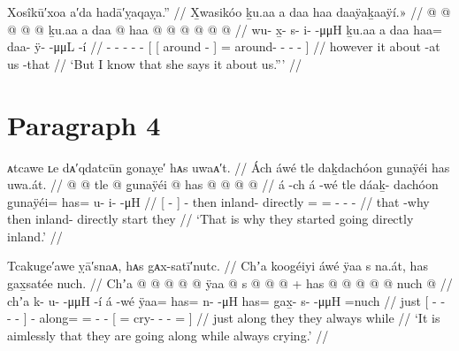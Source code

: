 \ex\label{ex:92-57-I-know-she-says}%
%
\begingl
	\glpreamble	Xosîkū′xoa a′da hadā′ỵaqaỵa.” //
	\glpreamble	X̱wasikóo ḵu.aa a daa haa daaÿaḵaaÿí.\!» //
	\gla	{} @ {} @ {} @ {} @ {} @ {} ḵu.aa
		{} {} a daa @ {} {}
			haa @  @ {} @ {} @ {} @ {} @ {} //
	\glb	wu- x̱- s- i-  -μμH ḵu.aa
		{} {} a daa {} {}
			haa= daa- ÿ-  -μμL -í {} //
	\glc	{}- - - -  - 
		{}[ {}[  around - {}]
			= around- -  - - {}] //
	\gld	{} {} {} {} {} {} however
		{} {} it about -at {}
			us  {} {} {} -that {} //
	\glft	‘But I know that she says it about us.”’
		//
\endgl
\xe


\section{Paragraph 4}\label{sec:92-para-4}

\ex\label{ex:92-58-why-they-went-directly-inland}%
%
\begingl
	\glpreamble	ᴀtcawe ʟe dᴀ′qdatcūn g̣onaỵe′ hᴀs uwaᴀ′t. //
	\glpreamble	Ách áwé tle daḵdachóon g̱unaÿéi has uwa.át. //
	\gla	{}  @ {} {}  @ {}
		tle  @ {}
		g̱unaÿéi @ has @  @ {} @ {} @ {} //
	\glb	{} á -ch {} á -wé
		tle dáaḵ- dachóon
		g̱unaÿéi= has= u- i-  -μH //
	\glc	{}[  - {}]  -
		then inland- directly
		= = - -  - //
	\gld	{} that -why {}  {}
		then inland- directly
		start they  {} {} {} //
	\glft	‘That is why they started going directly inland.’
		//
\endgl
\xe

\ex\label{ex:92-59-going-anywhere-crying}%
%
\begingl
	\glpreamble	Tcakuge′awe ỵā′snaᴀ, hᴀs gᴀx-satī′nutc. //
	\glpreamble	Chʼa koogéiyi áwé ÿaa s na.át, has gax̱satée nuch. //
	\gla	Chʼa {}  @ {} @ {} @ {} @ {} {}
		 @ {}
		ÿaa @ s @  @ {} @ {} +
		{} has @  @ {} @ {} @ {} @ \•nuch @ {} {} //
	\glb	chʼa {} k- u-  -μμH -í {}
		á -wé
		ÿaa= has= n-  -μH
		{} has= gax̱- s-  -μμH =nuch {} {} //
	\glc	just {}[ - -  - - {}]
		 -
		along= = -  -
		{}[ = cry- -
			 - = \· {}] //
	\gld	just {}  {} {} {} {} {}
		 {}
		along\• they  {} {}
		{} they  {} {} {} \•always \·while {} //
	\glft	‘It is aimlessly that they are going along while always crying.’
		//
\endgl
\xe

